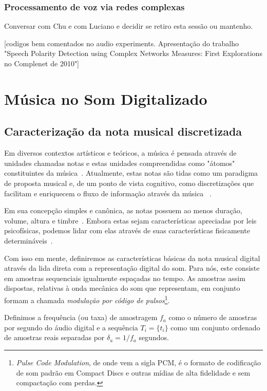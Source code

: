       \subsubsection{Processamento de voz via redes complexas}
Conversar com Chu e com Luciano e decidir se retiro esta sessão ou mantenho.

      [codigos bem comentados no audio experiments. Apresentação do trabalho "Speech Polarity Detection using Complex Networks Measures: First Explorations no Complenet de 2010"]



\section{Música no Som Digitalizado}

\subsection{Caracterização da nota musical discretizada}
Em diversos contextos artísticos e teóricos, 
a música é pensada através de 
unidades chamadas notas e 
estas unidades compreendidas como "átomos" constituintes da música~\cite{Wisnick, Lovelock, Webern}.
Atualmente, estas notas
são tidas como um paradigma de proposta musical
e, de um ponto de vista cognitivo, como discretizações
que facilitam e enriquecem o fluxo de informação através da música
~\cite{Roederer, Lacerda}.

Em sua concepção
simples e canônica, as notas possuem ao menos duração, volume, altura e timbre~\cite{Lacerda}. Embora estas
sejam características apreciadas por leis psicofísicas, podemos lidar com elas através de suas características
fisicamente determináveis~\cite{Roederer}.

Com isso em mente, definiremos as características básicas da nota musical digital através da lida direta com a representação digital do som.
Para nós, este consiste  em amostras sequenciais
igualmente espaçadas no tempo. As amostras assim dispostas,
relativas à onda mecânica do som que representam,
em conjunto formam a chamada \emph{modulação por código de pulsos}\footnote{\emph{Pulse Code Modulation},
de onde vem a sigla PCM, é o formato de codificação de som
padrão em Compact Discs e outras mídias de alta fidelidade e sem compactação com perdas.}.


 Definimos a
frequência (ou taxa) de amostragem $f_a$ como o número de amostras por segundo do áudio digital e
a sequência $T_i=\{t_i\}$ como um conjunto ordenado de amostras reais separadas por $\delta_a=1/f_a$ segundos.


